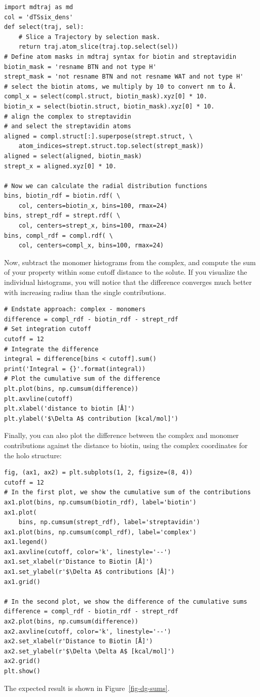 \documentclass[9pt,tutorial,pubversion]{livecoms}
\begin{document}
\begin{lstlisting}[style=python]
import mdtraj as md
col = 'dTSsix_dens'
def select(traj, sel):
    # Slice a Trajectory by selection mask.
    return traj.atom_slice(traj.top.select(sel))
# Define atom masks in mdtraj syntax for biotin and streptavidin
biotin_mask = 'resname BTN and not type H'
strept_mask = 'not resname BTN and not resname WAT and not type H'
# select the biotin atoms, we multiply by 10 to convert nm to Å.
compl_x = select(compl.struct, biotin_mask).xyz[0] * 10.
biotin_x = select(biotin.struct, biotin_mask).xyz[0] * 10.
# align the complex to streptavidin
# and select the streptavidin atoms
aligned = compl.struct[:].superpose(strept.struct, \
    atom_indices=strept.struct.top.select(strept_mask))
aligned = select(aligned, biotin_mask)
strept_x = aligned.xyz[0] * 10.

# Now we can calculate the radial distribution functions
bins, biotin_rdf = biotin.rdf( \
    col, centers=biotin_x, bins=100, rmax=24)
bins, strept_rdf = strept.rdf( \
    col, centers=strept_x, bins=100, rmax=24)
bins, compl_rdf = compl.rdf( \
    col, centers=compl_x, bins=100, rmax=24)
\end{lstlisting}
Now, subtract the monomer histograms from the complex, and compute the sum of your property within some cutoff distance to the solute.
If you visualize the individual histograms, you will notice that the difference converges much better with increasing radius than the single contributions.

\begin{lstlisting}[style=python]
# Endstate approach: complex - monomers
difference = compl_rdf - biotin_rdf - strept_rdf
# Set integration cutoff
cutoff = 12
# Integrate the difference
integral = difference[bins < cutoff].sum()
print('Integral = {}'.format(integral))
# Plot the cumulative sum of the difference
plt.plot(bins, np.cumsum(difference))
plt.axvline(cutoff)
plt.xlabel('distance to biotin [Å]')
plt.ylabel('$\Delta A$ contribution [kcal/mol]')
\end{lstlisting}
\pagebreak
Finally, you can also plot the difference between the complex and monomer contributions against the distance to biotin, using the complex coordinates for the holo structure:

\begin{lstlisting}[style=python]
fig, (ax1, ax2) = plt.subplots(1, 2, figsize=(8, 4))
cutoff = 12
# In the first plot, we show the cumulative sum of the contributions
ax1.plot(bins, np.cumsum(biotin_rdf), label='biotin')
ax1.plot(
    bins, np.cumsum(strept_rdf), label='streptavidin')
ax1.plot(bins, np.cumsum(compl_rdf), label='complex')
ax1.legend()
ax1.axvline(cutoff, color='k', linestyle='--')
ax1.set_xlabel(r'Distance to Biotin [Å]')
ax1.set_ylabel(r'$\Delta A$ contributions [Å]')
ax1.grid()

# In the second plot, we show the difference of the cumulative sums
difference = compl_rdf - biotin_rdf - strept_rdf
ax2.plot(bins, np.cumsum(difference))
ax2.axvline(cutoff, color='k', linestyle='--')
ax2.set_xlabel(r'Distance to Biotin [Å]')
ax2.set_ylabel(r'$\Delta \Delta A$ [kcal/mol]')
ax2.grid()
plt.show()
\end{lstlisting}
The expected result is shown in Figure~\ref{fig-dg-sums}.
\end{document}
